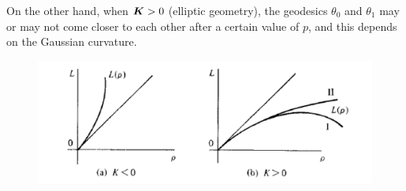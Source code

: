 \documentclass[11pt]{article}
\begin{document}
\begin{itemize}
\begin{itemize}
On the other hand, when $\boldsymbol{K}>0$ (elliptic geometry), the geodesics $\theta_{0}$ and $\theta_{1}$ may or may not come closer to each other after a certain value of $p$, and this depends on the Gaussian curvature.

\begin{figure}[tbh]
\centering
\begin{minipage}{0.6\linewidth}
 \centerline{\includegraphics[scale = 0.43]{arc_length_geodesic.png}}
\end{minipage}
\end{figure}
\end{itemize}
\end{itemize}
\end{document}
